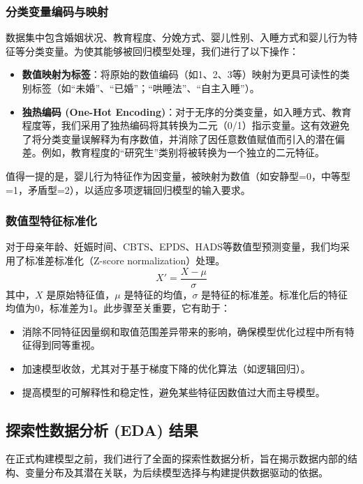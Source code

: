 \documentclass[withoutpreface,bwprint]{cumcmthesis}
\begin{document}
\subsubsection{分类变量编码与映射}
数据集中包含婚姻状况、教育程度、分娩方式、婴儿性别、入睡方式和婴儿行为特征等分类变量。为使其能够被回归模型处理，我们进行了以下操作：
\begin{itemize}
    \item \textbf{数值映射为标签}：将原始的数值编码（如1、2、3等）映射为更具可读性的类别标签（如“未婚”、“已婚”；“哄睡法”、“自主入睡”）。
    \item \textbf{独热编码 (One-Hot Encoding)}：对于无序的分类变量，如入睡方式、教育程度等，我们采用了独热编码将其转换为二元（0/1）指示变量。这有效避免了将分类变量误解释为有序数值，并消除了因任意数值赋值而引入的潜在偏差。例如，教育程度的“研究生”类别将被转换为一个独立的二元特征。
\end{itemize}
值得一提的是，婴儿行为特征作为因变量，被映射为数值（如安静型=0，中等型=1，矛盾型=2），以适应多项逻辑回归模型的输入要求。

\subsubsection{数值型特征标准化}
对于母亲年龄、妊娠时间、CBTS、EPDS、HADS等数值型预测变量，我们均采用了标准差标准化（Z-score normalization）处理。
$$ X' = \frac{X - \mu}{\sigma} $$
其中，$X$ 是原始特征值，$\mu$ 是特征的均值，$\sigma$ 是特征的标准差。标准化后的特征均值为0，标准差为1。此步骤至关重要，它有助于：
\begin{itemize}
    \item 消除不同特征因量纲和取值范围差异带来的影响，确保模型优化过程中所有特征得到同等重视。
    \item 加速模型收敛，尤其对于基于梯度下降的优化算法（如逻辑回归）。
    \item 提高模型的可解释性和稳定性，避免某些特征因数值过大而主导模型。
\end{itemize}

\subsection{探索性数据分析 (EDA) 结果}
在正式构建模型之前，我们进行了全面的探索性数据分析，旨在揭示数据内部的结构、变量分布及其潜在关联，为后续模型选择与构建提供数据驱动的依据。
\end{document}
